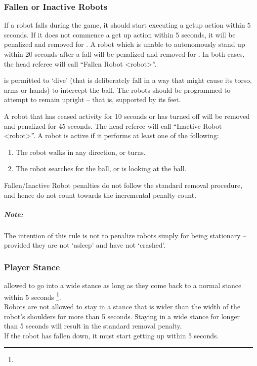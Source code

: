 \subsubsection{Fallen or Inactive Robots}
\label{sec:fallenrobots}

If a robot falls during the game, it should start executing a getup action within 5 seconds. If it does not commence a get up action within 5 seconds, it will be penalized and removed for \StandardPenaltyTime.
A robot which is unable to autonomously stand up within 20 seconds after a fall  will be penalized and removed for \StandardPenaltyTime. 
In both cases, the head referee will call ``Fallen Robot  \textless robot\textgreater''.

 is permitted to `dive' (that is deliberately fall in a way that might cause its torso, arms or hands) to intercept the ball. The robots should be programmed to attempt to remain upright -- that is, supported by its feet.

A robot that has ceased activity for 10 seconds or has turned off will be removed and penalized for 45 seconds.
The head referee will call ``Inactive Robot  \textless robot\textgreater''.
A robot is active if it performs at least one of the following:
\begin{enumerate}
	\item The robot walks in any direction, or turns.
	\item The robot searches for the ball, or is looking at the ball.
\end{enumerate}

Fallen/Inactive Robot penalties do not follow the standard removal procedure, and hence do not count towards the incremental penalty count.

\subparagraph{Note:} The intention of this rule is not to penalize robots simply for being stationary -- provided they are not `asleep' and have not `crashed'.

\subsubsection{Player Stance}
\label{sec:player_stance}
 allowed to go into a wide stance as long as they come back to a normal stance within 5 seconds \footnote{}. \\
Robots are not allowed to stay in a stance that is wider than the width of the robot's shoulders for more than 5 seconds. Staying in a wide stance for longer than 5 seconds will result in the standard removal penalty. \\
If the robot has fallen down, it must start getting up within 5 seconds. 

